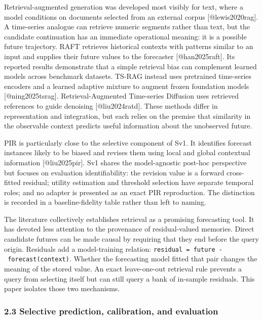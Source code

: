 \documentclass[
]{article}
\begin{document}
Retrieval-augmented generation was developed most visibly for text,
where a model conditions on documents selected from an external corpus
{[}@lewis2020rag{]}. A time-series analogue can retrieve numeric
segments rather than text, but the candidate continuation has an
immediate operational meaning: it is a possible future trajectory. RAFT
retrieves historical contexts with patterns similar to an input and
supplies their future values to the forecaster {[}@han2025raft{]}. Its
reported results demonstrate that a simple retrieval bias can complement
learned models across benchmark datasets. TS-RAG instead uses pretrained
time-series encoders and a learned adaptive mixture to augment frozen
foundation models {[}@ning2025tsrag{]}. Retrieval-Augmented Time-series
Diffusion uses retrieved references to guide denoising
{[}@liu2024ratd{]}. These methods differ in representation and
integration, but each relies on the premise that similarity in the
observable context predicts useful information about the unobserved
future.

PIR is particularly close to the selective component of Sv1. It
identifies forecast instances likely to be biased and revises them using
local and global contextual information {[}@liu2025pir{]}. Sv1 shares
the model-agnostic post-hoc perspective but focuses on evaluation
identifiability: the revision value is a forward cross-fitted residual;
utility estimation and threshold selection have separate temporal roles;
and no adapter is presented as an exact PIR reproduction. The
distinction is recorded in a baseline-fidelity table rather than left to
naming.

The literature collectively establishes retrieval as a promising
forecasting tool. It has devoted less attention to the provenance of
residual-valued memories. Direct candidate futures can be made causal by
requiring that they end before the query origin. Residuals add a
model-training relation:
\texttt{residual\ =\ future\ -\ forecast(context)}. Whether the
forecasting model fitted that pair changes the meaning of the stored
value. An exact leave-one-out retrieval rule prevents a query from
selecting itself but can still query a bank of in-sample residuals. This
paper isolates those two mechanisms.

\subsubsection{2.3 Selective prediction, calibration, and
evaluation}\label{23-selective-prediction-calibration-and-evaluation}
\end{document}
